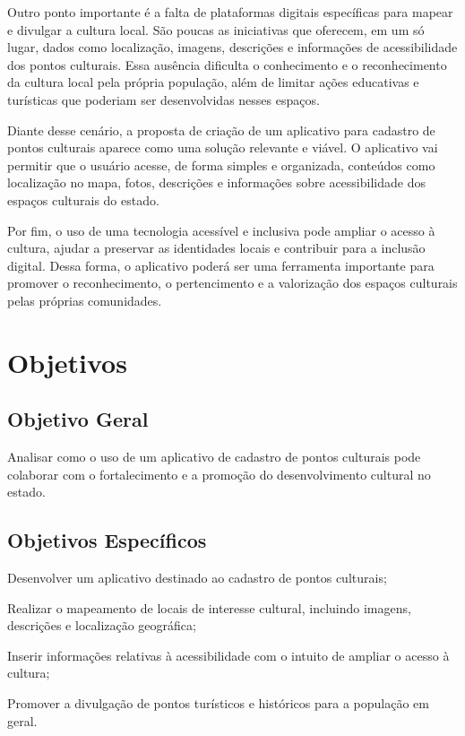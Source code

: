 Outro ponto importante é a falta de plataformas digitais específicas para mapear e divulgar a cultura local. São poucas as iniciativas que oferecem, em um só lugar, dados como localização, imagens, descrições e informações de acessibilidade dos pontos culturais. Essa ausência dificulta o conhecimento e o reconhecimento da cultura local pela própria população, além de limitar ações educativas e turísticas que poderiam ser desenvolvidas nesses espaços.

Diante desse cenário, a proposta de criação de um aplicativo para cadastro de pontos culturais aparece como uma solução relevante e viável. O aplicativo vai permitir que o usuário acesse, de forma simples e organizada, conteúdos como localização no mapa, fotos, descrições e informações sobre acessibilidade dos espaços culturais do estado.

Por fim, o uso de uma tecnologia acessível e inclusiva pode ampliar o acesso à cultura, ajudar a preservar as identidades locais e contribuir para a inclusão digital. Dessa forma, o aplicativo poderá ser uma ferramenta importante para promover o reconhecimento, o pertencimento e a valorização dos espaços culturais pelas próprias comunidades.

\section{Objetivos}
\subsection{Objetivo Geral}

Analisar como o uso de um aplicativo de cadastro de pontos culturais pode colaborar com o fortalecimento e a promoção do desenvolvimento cultural no estado.

\subsection{Objetivos Específicos}
\begin{lista}
  \item Desenvolver um aplicativo destinado ao cadastro de pontos culturais;
  \item Realizar o mapeamento de locais de interesse cultural, incluindo imagens, descrições e localização geográfica;
  \item Inserir informações relativas à acessibilidade com o intuito de ampliar o acesso à cultura;
  \item Promover a divulgação de pontos turísticos e históricos para a população em geral.
\end{lista}




